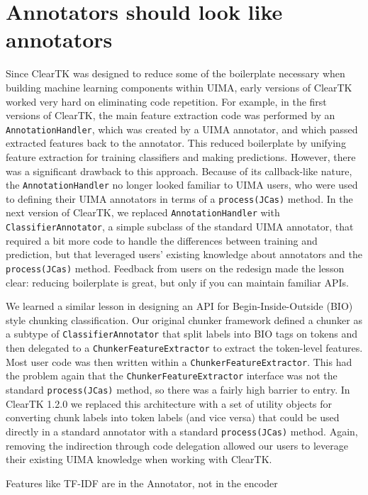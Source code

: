 \documentclass[10pt, a4paper]{article}
\begin{document}
\section{Annotators should look like annotators}
Since ClearTK was designed to reduce some of the boilerplate necessary when building machine learning components within UIMA, early versions of ClearTK worked very hard on eliminating code repetition.
For example, in the first versions of ClearTK, the main feature extraction code was performed by an \texttt{AnnotationHandler}, which was created by a UIMA annotator, and which passed extracted features back to the annotator.
This reduced boilerplate by unifying feature extraction for training classifiers and making predictions.
However, there was a significant drawback to this approach.
Because of its callback-like nature, the \texttt{AnnotationHandler} no longer looked familiar to UIMA users, who were used to defining their UIMA annotators in terms of a \texttt{process(JCas)} method.
In the next version of ClearTK, we replaced \texttt{AnnotationHandler} with \texttt{ClassifierAnnotator}, a simple subclass of the standard UIMA annotator, that required a bit more code to handle the differences between training and prediction, but that leveraged users' existing knowledge about annotators and the \texttt{process(JCas)} method.
Feedback from users on the redesign made the lesson clear: reducing boilerplate is great, but only if you can maintain familiar APIs.

We learned a similar lesson in designing an API for Begin-Inside-Outside (BIO) style chunking classification.
Our original chunker framework defined a chunker as a subtype of \texttt{ClassifierAnnotator} that split labels into BIO tags on tokens and then delegated to a \texttt{ChunkerFeatureExtractor} to extract the token-level features.
Most user code was then written within a \texttt{ChunkerFeatureExtractor}.
This had the problem again that the \texttt{ChunkerFeatureExtractor} interface was not the standard \texttt{process(JCas)} method, so there was a fairly high barrier to entry.
In ClearTK 1.2.0 we replaced this architecture with a set of utility objects for converting chunk labels into token labels (and vice versa) that could be used directly in a standard annotator with a standard \texttt{process(JCas)} method.
Again, removing the indirection through code delegation allowed our users to leverage their existing UIMA knowledge when working with ClearTK.

Features like TF-IDF are in the Annotator, not in the encoder
\end{document}
